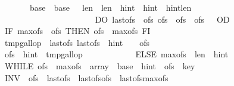 \begin{isabellebody}
\ \ \ \ \ \ \ \ \ \ \ \ \ \ \ \ \ \ \ \ {\isasymacute}base\ {\isacharequal}\ \isactrlbsup {\isasymsigma}\isactrlesup base\ {\isasymand}\ \ {\isasymacute}len\ {\isacharequal}\ \isactrlbsup {\isasymsigma}\isactrlesup len\ {\isasymand}\ {\isasymacute}hint\ {\isacharequal}\ \isactrlbsup {\isasymsigma}\isactrlesup hint\ {\isasymand}\ {\isasymacute}hint{\isacharless}{\isasymacute}len\isanewline
\ \ \ \ \ \ \ \ \ \ \ \ \ \ \ \ \ \ \ \ {\isasymrbrace}\ \isanewline
\ \ \ \ \ \ \ \ \ \ \ \ \ \ DO\ {\isasymacute}last{\isacharunderscore}ofs\ {\isacharcolon}{\isacharequal}{\isacharequal}\ {\isasymacute}ofs{\isacharsemicolon}{\isacharsemicolon}\ {\isasymacute}ofs\ {\isacharcolon}{\isacharequal}{\isacharequal}\ {\isasymacute}ofs\ {\isacharplus}\ {\isasymacute}ofs\ {\isacharplus}\ {}\ OD{\isacharsemicolon}{\isacharsemicolon}\isanewline
\ \ \ \ \ \ \ \ \ \ \ \ \ \ IF\ {\isasymacute}max{\isacharunderscore}ofs\ {\isacharless}\ {\isasymacute}ofs\ THEN\ {\isasymacute}ofs\ {\isacharcolon}{\isacharequal}{\isacharequal}\ {\isasymacute}max{\isacharunderscore}ofs\ FI{\isacharsemicolon}{\isacharsemicolon}\isanewline
\ \ \ \ \ \ \ \ \ \ \ \ \ \ {\isasymacute}tmp{\isacharunderscore}gallop\ {\isacharcolon}{\isacharequal}{\isacharequal}\ {\isasymacute}last{\isacharunderscore}ofs{\isacharsemicolon}{\isacharsemicolon}\ {\isasymacute}last{\isacharunderscore}ofs\ {\isacharcolon}{\isacharequal}{\isacharequal}\ {\isasymacute}hint\ {\isacharplus}\ {}\ {\isacharminus}\ {\isasymacute}ofs{\isacharsemicolon}{\isacharsemicolon}\isanewline
\ \ \ \ \ \ \ \ \ \ \ \ \ \ {\isasymacute}ofs\ {\isacharcolon}{\isacharequal}{\isacharequal}\ {\isasymacute}hint\ {\isacharminus}\ {\isasymacute}tmp{\isacharunderscore}gallop\isanewline
\ \ \ \ \ \ \ \ \ \ \ \ ELSE\ {\isasymacute}max{\isacharunderscore}ofs\ {\isacharcolon}{\isacharequal}{\isacharequal}\ {\isasymacute}len\ {\isacharminus}\ {\isasymacute}hint{\isacharsemicolon}{\isacharsemicolon}\isanewline
\ \ \ \ \ \ \ \ \ \ \ \ \ \ WHILE\ {\isasymacute}ofs\ {\isacharless}\ {\isasymacute}max{\isacharunderscore}ofs\ {\isasymand}\ {\isasymacute}array\ {\isacharbang}\ {\isacharparenleft}{\isasymacute}base\ {\isacharplus}\ {\isasymacute}hint\ {\isacharplus}\ {\isasymacute}ofs{\isacharparenright}\ {\isasymle}\ {\isasymacute}key\isanewline
\ \ \ \ \ \ \ \ \ \ \ \ \ \ INV\ {\isasymlbrace}\ {\isasymacute}ofs{\isachargreater}{}\ {\isasymand}\ {\isasymacute}last{\isacharunderscore}ofs{\isasymge}{}\ {\isasymand}\ {\isasymacute}last{\isacharunderscore}ofs{\isacharless}{\isasymacute}ofs\ {\isasymand}\ {\isasymacute}last{\isacharunderscore}ofs{\isacharless}{\isasymacute}max{\isacharunderscore}ofs\ {\isasymand}\isanewline

\end{isabellebody}

